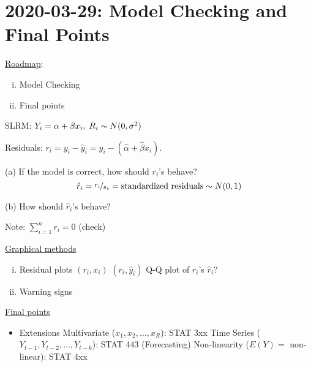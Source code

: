\section{2020-03-29: Model Checking and Final Points}
\underline{Roadmap}:
\begin{enumerate}[(i)]
    \item Model Checking
    \item Final points
\end{enumerate}
SLRM: $ Y_i = \alpha+\beta x_i,\; R_i \thicksim N(0,\sigma^2) $

Residuals: $ r_i=y_i-\hat{y}_i=y_i-(\hat{\alpha}+\hat{\beta}x_i) $.

(a) If the model is correct, how should $ r_i $'s behave?
\[ \hat{r}_i=\nicefrac{r_i}{s_e}=\text{standardized residuals}
    \thicksim N(0,1) \]

(b) How should $ \hat{r}_i $'s behave?

Note: $ \sum\limits_{i=1}^{n} r_i=0 $ (check)

\underline{Graphical methods}
\begin{enumerate}[(i)]
    \item Residual plots
          \subitem $ (r_i,x_i) $
          \subitem $ (r_i,\hat{y}_i) $
          \subitem Q-Q plot of $ r_i $'s
          \subitem $ \hat{r}_i $?
    \item Warning signs
\end{enumerate}
\underline{Final points}
\begin{itemize}
    \item Extensions
          \subitem Multivariate ($ x_1,x_2,\ldots ,x_R $): STAT 3xx
          \subitem Time Series ($ Y_{t-1},Y_{t-2},\ldots ,Y_{t-k} $): STAT 443 (Forecasting)
          \subitem Non-linearity ($ E(Y)= $ non-linear): STAT 4xx
\end{itemize}
